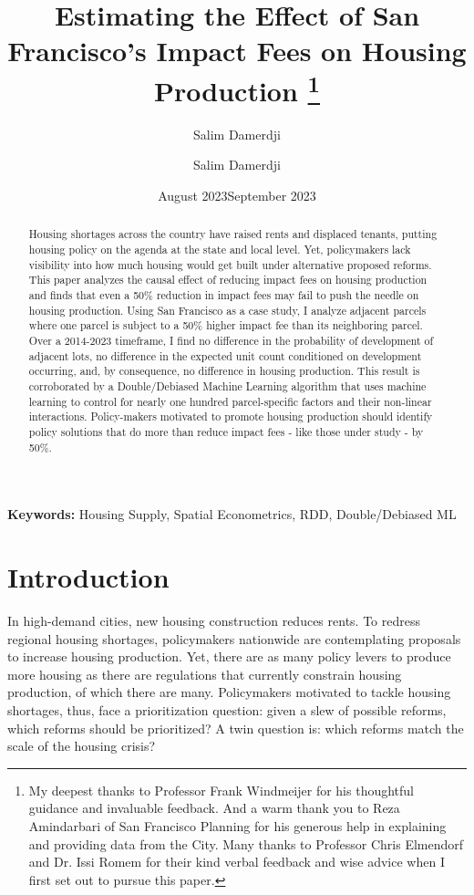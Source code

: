 \documentclass[a4paper,12pt]{article}
\author{Salim Damerdji}
\date{August 2023}
\title{Estimating the Effect of San Francisco's Impact Fees on Housing Production \thanks{My deepest thanks to Professor Frank Windmeijer for his thoughtful guidance and invaluable feedback. And a warm thank you to Reza Amindarbari of San Francisco Planning for his generous help in explaining and providing data from the City. Many thanks to Professor Chris Elmendorf and Dr. Issi Romem for their kind verbal feedback and wise advice when I first set out to pursue this paper.}}
\author{Salim Damerdji}
\date{September 2023}
\begin{document}
\onehalfspacing
\maketitle
\begin{abstract}
Housing shortages across the country have raised rents and displaced tenants, putting housing policy on the agenda at the state and local level. Yet, policymakers lack visibility into how much housing would get built under alternative proposed reforms. This paper analyzes the causal effect of reducing impact fees on housing production and finds that even a 50\% reduction in impact fees may fail to push the needle on housing production. Using San Francisco as a case study, I analyze adjacent parcels where one parcel is subject to a 50\% higher impact fee than its neighboring parcel. Over a 2014-2023 timeframe, I find no difference in the probability of development of adjacent lots, no difference in the expected unit count conditioned on development occurring, and, by consequence, no difference in housing production. This result is corroborated by a Double/Debiased Machine Learning algorithm that uses machine learning to control for nearly one hundred parcel-specific factors and their non-linear interactions. Policy-makers motivated to promote housing production should identify policy solutions that do more than reduce impact fees - like those under study - by 50\%.
\end{abstract}
\renewcommand{\arraystretch}{1.5}
\vspace{5}
\textbf{Keywords:} Housing Supply, Spatial Econometrics, RDD, Double/Debiased ML
\clearpage
\section{Introduction}

In high-demand cities, new housing construction reduces rents.\cite{pennington2021does}\cite{mense2020impact}\cite{li2022new}\cite{asquith2019supply}\cite{mast2019effect}\cite{glaeser2018economic} To redress regional housing shortages,\cite{herkenhoff2018tarnishing} policymakers nationwide are contemplating proposals to increase housing production.\cite{wegmann2020death} Yet, there are as many policy levers to produce more housing as there are regulations that currently constrain housing production, of which there are many.\cite{bronin2023zoning}\cite{herkenhoff2018tarnishing} Policymakers motivated to tackle housing shortages, thus, face a prioritization question: given a slew of possible reforms, which reforms should be prioritized? A twin question is: which reforms match the scale of the housing crisis? 
\end{document}
